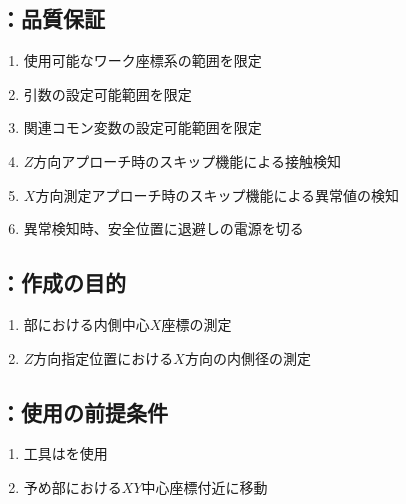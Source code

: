 \subsection{\MXOface：品質保証}
\begin{enumerate}[label*=\sarrow]
\item 使用可能なワーク座標系の範囲を限定
\item {}引数の設定可能範囲を限定
\item 関連コモン変数の設定可能範囲を限定
\item $Z$方向アプローチ時のスキップ機能による接触検知
\item $X$方向測定アプローチ時のスキップ機能による異常値の検知
\item 異常検知時、安全位置に退避し\TouchSensorProbe の電源を切る
\end{enumerate}



\clearpage


\subsection{\MXIWidth：作成の目的}
\begin{enumerate}[label*=\sarrow]
\item \EndFace 部における内側中心$X$座標の測定
\item $Z$方向指定位置における$X$方向の内側径の測定
\end{enumerate}


\subsection{\MXIWidth：使用の前提条件}
\begin{enumerate}[label*=\sarrow]
\item 工具は\TouchSensorProbe を使用
\item 予め\EndFace 部における$XY$中心座標付近に移動
\end{enumerate}


